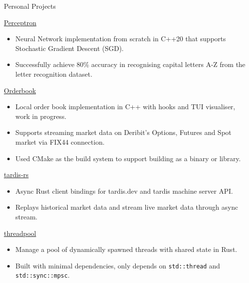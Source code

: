 \documentclass{article}
\newlength{\tabin}
\newlength{\secsep}
\newcommand{\lineunder}{\vspace*{-8pt} \\ \hspace*{-6pt} \hrulefill \\ \vspace*{-15pt}}
\newenvironment{tabbedsection}[1]{
  \begin{list}{}{
      \setlength{\itemsep}{0pt}
      \setlength{\labelsep}{0pt}
      \setlength{\labelwidth}{0pt}
      \setlength{\leftmargin}{\tabin}
      \setlength{\rightmargin}{\tabin}
      \setlength{\listparindent}{0pt}
      \setlength{\parsep}{0pt}
      \setlength{\parskip}{0pt}
      \setlength{\partopsep}{0pt}
      \setlength{\topsep}{#1}
    }
  \item[]
}{\end{list}}
\newenvironment{resume_section}[1]{
  \filbreak
  \vspace{2\secsep}
  \textsc{\large#1}
  \lineunder
  \begin{tabbedsection}{\secsep}
}{\end{tabbedsection}}
\newenvironment{resume_subsection}[2][]{
  \textbf{#2} \hfill {\footnotesize #1} \hspace{2em}
  \begin{tabbedsection}{0.5\secsep}
}{\end{tabbedsection}}
\newenvironment{subitems}{
  \renewcommand{\labelitemi}{-}
  \begin{itemize}
      \setlength{\labelsep}{1em}
}{\end{itemize}}
\begin{document}
\begin{resume_section}{Personal Projects}
  \begin{resume_subsection}[(November 2023)]{\href{https://github.com/marcustut/perceptron}{Perceptron}}
    \begin{subitems}
      \item Neural Network implementation from scratch in C++20 that supports Stochastic Gradient Descent (SGD).
      \item Successfully achieve 80\% accuracy in recognising capital letters A-Z from the letter recognition dataset.
    \end{subitems}
  \end{resume_subsection}

  \begin{resume_subsection}[(October 2023)]{\href{https://github.com/marcustut/orderbook}{Orderbook}}
    \begin{subitems}
      \item Local order book implementation in C++ with hooks and TUI visualiser, work in progress.
      \item Supports streaming market data on Deribit's Options, Futures and Spot market via FIX44 connection.
      \item Used CMake as the build system to support building as a binary or library.
    \end{subitems}
  \end{resume_subsection}

  \begin{resume_subsection}[(September 2023)]{\href{https://github.com/cybotrade/tardis-rs}{tardis-rs}}
    \begin{subitems}
      \item Async Rust client bindings for tardis.dev and tardis machine server API.
      \item Replays historical market data and stream live market data through async stream.
    \end{subitems}
  \end{resume_subsection}

  \begin{resume_subsection}[(April 2023)]{\href{https://github.com/marcustut/threadpool}{threadpool}}
    \begin{subitems}
      \item Manage a pool of dynamically spawned threads with shared state in Rust.
      \item Built with minimal dependencies, only depends on \texttt{std::thread} and \texttt{std::sync::mpsc}.
    \end{subitems}
  \end{resume_subsection}


\end{resume_section}
\end{document}
